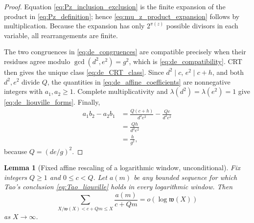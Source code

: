 \documentclass[11pt]{amsart}
\numberwithin{equation}{section}
\theoremstyle{plain}
\newtheorem{lemma}[theorem]{Lemma}
\theoremstyle{definition}
\theoremstyle{remark}
\newcommand{\liou}{\lambda}
\newcommand{\what}{\mathfrak w}
\begin{document}
\begin{proof}
Equation \eqref{eq:Pz_inclusion_exclusion} is the finite expansion of the product in \eqref{eq:Pz_definition}; hence \eqref{eq:mu_z_product_expansion} follows by multiplication.  Because the expansion has only $2^{\pi(z)}$ possible divisors in each variable, all rearrangements are finite.

The two congruences in \eqref{eq:de_congruences} are compatible precisely when their residues agree modulo $\gcd(d^2,e^2)=g^2$, which is \eqref{eq:de_compatibility}.  CRT then gives the unique class \eqref{eq:de_CRT_class}.  Since $d^2\mid c$, $e^2\mid c+h$, and both $d^2,e^2$ divide $Q$, the quantities in \eqref{eq:de_affine_coefficients} are nonnegative integers with $a_1,a_2\ge1$.  Complete multiplicativity and $\liou(d^2)=\liou(e^2)=1$ give \eqref{eq:de_liouville_forms}.  Finally,
\begin{align}
a_1b_2-a_2b_1
&=\frac{Q(c+h)}{d^2e^2}-\frac{Qc}{d^2e^2}
\label{eq:de_det_first}\\
&=\frac{Qh}{d^2e^2}
\label{eq:de_det_second}\\
&=\frac{h}{g^2},
\label{eq:de_det_final}
\end{align}
because $Q=(de/g)^2$.
\end{proof}

\begin{lemma}[Fixed affine rescaling of a logarithmic window, unconditional]
\label{lem:affine_log_window}
Fix integers $Q\ge1$ and $0\le c<Q$.  Let $a(m)$ be any bounded sequence for which Tao's conclusion \eqref{eq:Tao_liouville} holds in every logarithmic window.  Then
\begin{equation}
\sum_{X/\what(X)<c+Qm\le X}\frac{a(m)}{c+Qm}
=o(\log\what(X))
\label{eq:affine_window_conclusion}
\end{equation}
as $X\to\infty$.
\end{lemma}
\end{document}
